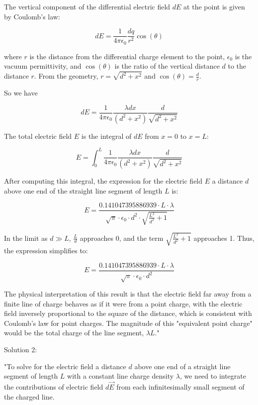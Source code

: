 The vertical component of the differential electric field \( dE \) at the point is given by Coulomb's law:

\[ dE = \frac{1}{4\pi\epsilon_0} \frac{dq}{r^2} \cos(\theta) \]

where \( r \) is the distance from the differential charge element to the point, \( \epsilon_0 \) is the vacuum permittivity, and \( \cos(\theta) \) is the ratio of the vertical distance \( d \) to the distance \( r \). From the geometry, \( r = \sqrt{d^2 + x^2} \) and \( \cos(\theta) = \frac{d}{r} \).

So we have

\[ dE = \frac{1}{4\pi\epsilon_0} \frac{\lambda dx}{(d^2 + x^2)} \frac{d}{\sqrt{d^2 + x^2}} \]

The total electric field \( E \) is the integral of \( dE \) from \( x = 0 \) to \( x = L \):

\[ E = \int_0^L \frac{1}{4\pi\epsilon_0} \frac{\lambda dx}{(d^2 + x^2)} \frac{d}{\sqrt{d^2 + x^2}} \]

After computing this integral, the expression for the electric field \( E \) a distance \( d \) above one end of the straight line segment of length \( L \) is:

\[ E = \frac{0.141047395886939 \cdot L \cdot \lambda}{\sqrt{\pi} \cdot \epsilon_0 \cdot d^2 \cdot \sqrt{\frac{L^2}{d^2} + 1}} \]

In the limit as \( d \gg L \), \( \frac{L}{d} \) approaches 0, and the term \( \sqrt{\frac{L^2}{d^2} + 1} \) approaches 1. Thus, the expression simplifies to:

\[ E = \frac{0.141047395886939 \cdot L \cdot \lambda}{\sqrt{\pi} \cdot \epsilon_0 \cdot d^2} \]

The physical interpretation of this result is that the electric field far away from a finite line of charge behaves as if it were from a point charge, with the electric field inversely proportional to the square of the distance, which is consistent with Coulomb's law for point charges. The magnitude of this "equivalent point charge" would be the total charge of the line segment, \( \lambda L \)."

Solution 2:

"To solve for the electric field a distance \( d \) above one end of a straight line segment of length \( L \) with a constant line charge density \( \lambda \), we need to integrate the contributions of electric field \( d\vec{E} \) from each infinitesimally small segment of the charged line.

